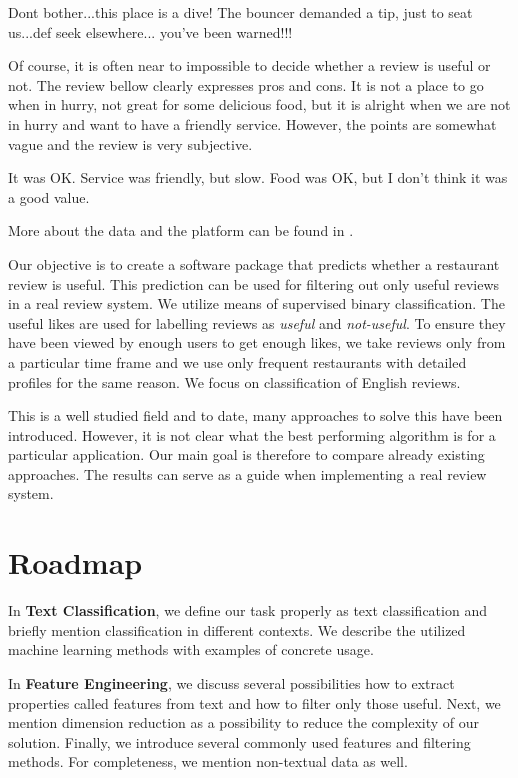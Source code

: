 \begin{code}
Dont bother...this place is a dive!
The bouncer demanded a tip, just to seat us...def seek elsewhere...
you've been warned!!!
\end{code}

Of course, it is often near to impossible to decide whether a review is useful or not.
The review bellow clearly expresses pros and cons.
It is not a place to go when in hurry, not great for some delicious food,
but it is alright when we are not in hurry and want to have a friendly service.
However, the points are somewhat vague and the review is very subjective.

\begin{code}
It was OK. Service was friendly, but slow.
Food was OK, but I don't think it was a good value.
\end{code}


More about the data and the platform can be found in .

Our objective is to create a software package that predicts whether
a restaurant review is useful.
This prediction can be used for filtering out only useful reviews in a real review system.
We utilize means of supervised binary classification.
The useful likes are used for labelling reviews as \textit{useful} and \textit{not-useful}.
To ensure they have been viewed by enough users to get enough likes,
we take reviews only from a particular time frame
and we use only frequent restaurants with detailed profiles for the same reason.
We focus on classification of English reviews.

This is a well studied field and to date, many approaches to solve this have been introduced.
However, it is not clear what the best performing algorithm is for a particular application.
Our main goal is therefore to compare already existing approaches.
The results can serve as a guide when implementing a real review system.

\section{Roadmap}

In \textbf{ Text Classification}, we define our task properly as text classification and briefly mention classification in different contexts.
We describe the utilized machine learning methods with examples of concrete usage.

In \textbf{ Feature Engineering}, we discuss several possibilities how to extract properties called features from text and how to filter only those useful.
Next, we mention dimension reduction as a possibility to reduce the complexity of our solution.
Finally, we introduce several commonly used features and filtering methods.
For completeness, we mention non-textual data as well.

